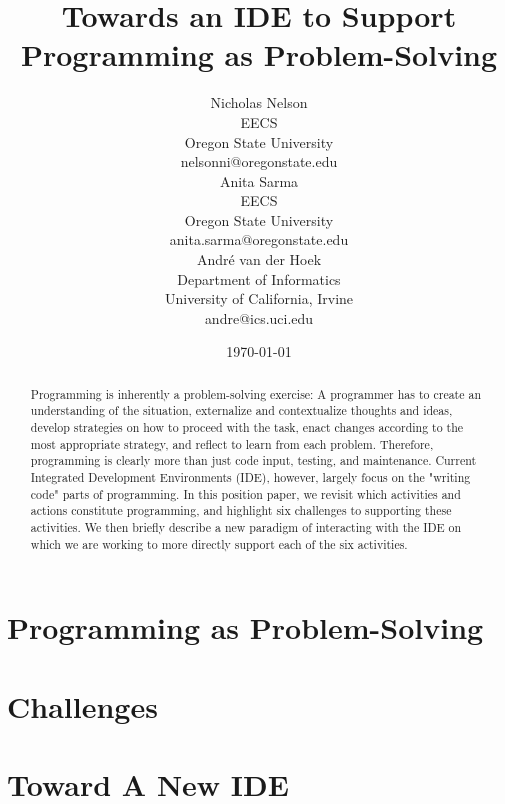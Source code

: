 \documentclass{ppig}
\title{Towards an IDE to Support Programming as Problem-Solving}
\author{Nicholas Nelson \\
  EECS \\
  Oregon State University \\
  nelsonni@oregonstate.edu \\
  \And
  Anita Sarma \\
  EECS\\
  Oregon State University \\
  anita.sarma@oregonstate.edu \\
  \And
  André van der Hoek \\
  Department of Informatics \\
  University of California, Irvine \\
  andre@ics.uci.edu
}
\date{\today}
\begin{document}
\maketitle
\thispagestyle{empty}

\begin{abstract}

Programming is inherently a problem-solving exercise: A programmer has to create an understanding of the situation, externalize and contextualize thoughts and ideas, develop strategies on how to proceed with the task, enact changes according to the most appropriate strategy, and reflect to learn from each problem.
Therefore, programming is clearly more than just code input, testing, and maintenance.
Current Integrated Development Environments (IDE), however, largely focus on the "writing code" parts of programming.
In this position paper, we revisit which activities and actions constitute programming, and highlight six challenges to supporting these activities. 
We then briefly describe a new paradigm of interacting with the IDE on which we are working to more directly support each of the six activities. 
\end{abstract}

\section{Programming as Problem-Solving}


\section{Challenges}\label{challenges}



\section{Toward A New IDE}




\end{document}
